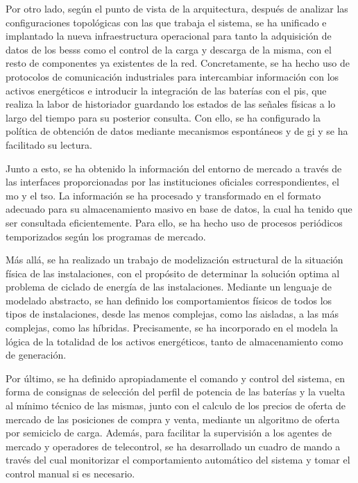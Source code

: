 Por otro lado, según el punto de vista de la arquitectura, después de analizar las configuraciones topológicas con las que trabaja el sistema, se ha unificado e implantado la nueva infraestructura operacional para tanto la adquisición de datos de los \glspl{bess} como el control de la carga y descarga de la misma, con el resto de componentes ya existentes de la red. Concretamente, se ha hecho uso de protocolos de comunicación industriales para intercambiar información con los activos energéticos e introducir la integración de las baterías con el \gls{pis}, que realiza la labor de historiador guardando los estados de las señales físicas a lo largo del tiempo para su posterior consulta. Con ello, se ha configurado la política de obtención de datos mediante mecanismos espontáneos y de \gls{gi} y se ha facilitado su lectura.

Junto a esto, se ha obtenido la información del entorno de mercado a través de las interfaces proporcionadas por las instituciones oficiales correspondientes, el \gls{mo} y el \gls{tso}. La información se ha procesado y transformado en el formato adecuado para su almacenamiento masivo en base de datos, la cual ha tenido que ser consultada eficientemente. Para ello, se ha hecho uso de procesos periódicos temporizados según los programas de mercado.

Más allá, se ha realizado un trabajo de modelización estructural de la situación física de las instalaciones, con el propósito de determinar la solución optima al problema de ciclado de energía de las instalaciones. Mediante un lenguaje de modelado abstracto, se han definido los comportamientos físicos de todos los tipos de instalaciones, desde las menos complejas, como las aisladas, a las más complejas, como las híbridas. Precisamente, se ha incorporado en el modela la lógica de la totalidad de los activos energéticos, tanto de almacenamiento como de generación.

Por último, se ha definido apropiadamente el comando y control del sistema, en forma de consignas de selección del perfil de potencia de las baterías y la vuelta al mínimo técnico de las mismas, junto con el calculo de los precios de oferta de mercado de las posiciones de compra y venta, mediante un algoritmo de oferta por semiciclo de carga. Además, para facilitar la supervisión a los agentes de mercado y operadores de telecontrol, se ha desarrollado un cuadro de mando a través del cual monitorizar el comportamiento automático del sistema y tomar el control manual si es necesario.

